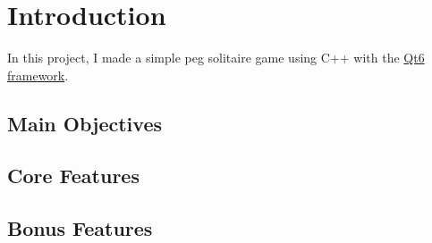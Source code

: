 \section{Introduction}
\label{sec:introduction}

In this project, I made a simple peg solitaire game using C++ with the \href{https://www.qt.io/}{Qt6 framework}.

\subsection{Main Objectives}

\subsection{Core Features}

\subsection{Bonus Features}
